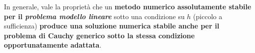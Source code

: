 \highspace
In generale, vale la proprietà che un \textbf{metodo numerico assolutamente stabile per il \emph{problema modello lineare}} sotto una condizione su $h$ (piccolo a sufficienza) \textbf{produce una soluzione numerica stabile anche per il problema di Cauchy generico sotto la stessa condizione opportunatamente adattata}.